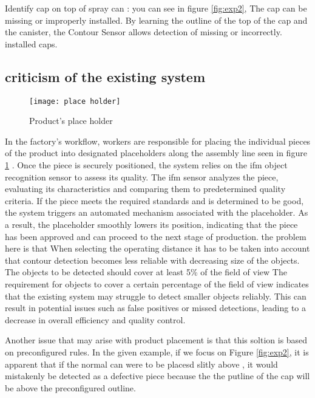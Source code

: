 \FloatBarrier
Identify cap on top of spray can :  you can see in figure \ref{fig:exp2}, The cap can be missing or improperly installed. By learning the outline of the top of the cap and the canister, the Contour Sensor allows detection of missing or incorrectly.\cite{Tnd}
installed caps.
\subsection{criticism of the existing system}
\FloatBarrier
\begin{figure}[h]

         \centering
        \texttt{[image: place holder]}
   
        \caption{Product's place holder}
        \label{fig:place holder}
\FloatBarrier
    \end{figure}

\FloatBarrier


In the factory's workflow, workers are responsible for placing the individual pieces of the product into designated placeholders along the assembly line seen in figure \ref{fig:place holder} . Once the piece is securely positioned, the system relies on the ifm object recognition sensor to assess its quality.
The ifm sensor analyzes the piece, evaluating its characteristics and comparing them to predetermined quality criteria. If the piece meets the required standards and is determined to be good, the system triggers an automated mechanism associated with the placeholder. As a result, the placeholder smoothly lowers its position, indicating that the piece has been approved and can proceed to the next stage of production. the problem here is that When selecting the operating distance it has to be taken into account that contour detection becomes less reliable with decreasing size of the objects. The objects to
be detected should cover at least 5\% of the field of view
The requirement for objects to cover a certain percentage of the field of view indicates that the existing system may struggle to detect smaller objects reliably. This can result in potential issues such as false positives or missed detections, leading to a decrease in overall efficiency and quality control.

Another issue that may arise with product placement is that this soltion is based on preconfigured rules. In the given example, if we focus on Figure \ref{fig:exp2}, it is apparent that if the normal can were to be placesd slitly above  , it would mistakenly be detected as a defective piece because the the putline of the cap will be above the preconfigured outline.

